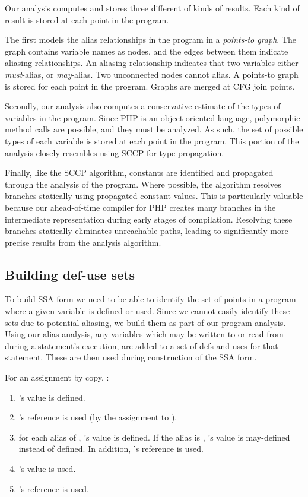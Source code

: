 Our analysis computes and stores three different of kinds of results.
Each kind of result is stored at each point in the program.

The first models the alias relationships in the program in a
\textit{points-to graph}.  The graph contains variable
names as nodes, and the edges between them indicate aliasing
relationships.  An aliasing relationship indicates that two variables
either \textit{must}-alias, or \textit{may}-alias.  Two unconnected
nodes cannot alias.  A points-to graph is stored for each point in the
program.  Graphs are merged at CFG join points.

Secondly, our analysis also computes a conservative estimate of the
types of variables in the program.  Since PHP is an object-oriented
language, polymorphic method calls are possible, and they must be
analyzed.  As such, the set of possible types of each variable is
stored at each point in the program.  This portion of the analysis
closely resembles using SCCP for type propagation.

Finally, like the SCCP algorithm, constants are identified and
propagated through the analysis of the program. Where possible, the
algorithm resolves branches statically using propagated constant
values. This is particularly valuable because our \phc ahead-of-time
compiler for PHP creates many branches in the intermediate
representation during early stages of compilation.  Resolving these
branches statically eliminates unreachable paths, leading to
significantly more precise results from the analysis algorithm.


\subsection{Building def-use sets}

To build SSA form we need to be able to identify the set of points in
a program where a given variable is defined or used. Since we cannot
easily identify these sets due to potential aliasing, we build them as
part of our program analysis.  Using our alias analysis, any variables
which may be written to or read from during a statement's execution,
are added to a set of defs and uses for that statement.  These are
then used during construction of the SSA form.

For an assignment by copy, :

\begin{enumerate}
	\item
		's value is defined.
	\item
		's reference is used (by the assignment to ).
	\item
		for each alias  of , 's
                value is defined.  If the alias is ,
                's value is may-defined instead of defined.
                In addition, 's reference is used.
	\item
		's value is used.
	\item
		's reference is used.

\end{enumerate}

